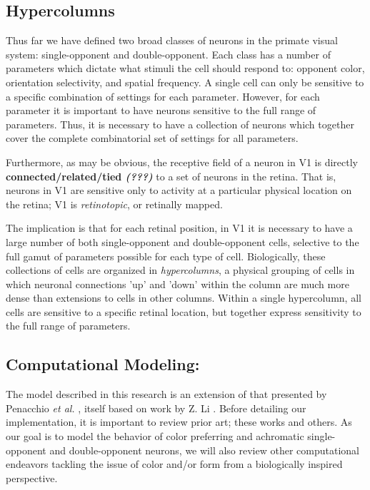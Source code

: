 \documentclass[journal,onecolumn]{IEEEtran}
\begin{document}
\subsection*{Hypercolumns}

Thus far we have defined two broad classes of neurons in the primate visual system: single-opponent and double-opponent. Each class has a number of parameters which dictate what stimuli the cell should respond to: opponent color, orientation selectivity, and spatial frequency. A single cell can only be sensitive to a specific combination of settings for each parameter. However, for each parameter it is important to have neurons sensitive to the full range of parameters. Thus, it is necessary to have a collection of neurons which together cover the complete combinatorial set of settings for all parameters.

Furthermore, as may be obvious, the receptive field of a neuron in V1 is directly \textbf{connected/related/tied \textit{(???)}} to a set of neurons in the retina. That is, neurons in V1 are sensitive only to activity at a particular physical location on the retina; V1 is \textit{retinotopic}, or retinally mapped.

The implication is that for each retinal position, in V1 it is necessary to have a large number of both single-opponent and double-opponent cells, selective to the full gamut of parameters possible for each type of cell. Biologically, these collections of cells are organized in \textit{hypercolumns}, a physical grouping of cells in which neuronal connections 'up' and 'down' within the column are much more dense than extensions to cells in other columns. Within a single hypercolumn, all cells are sensitive to a specific retinal location, but together express sensitivity to the full range of parameters.


\subsection{Computational Modeling:}

The model described in this research is an extension of that presented by Penacchio \textit{et al.} \cite{penacchio:2013}, itself based on work by Z. Li \cite{li:1998, li:1999}. Before detailing our implementation, it is important to review prior art; these works and others. As our goal is to model the behavior of color preferring and achromatic single-opponent and double-opponent neurons, we will also review other computational endeavors tackling the issue of color and/or form from a biologically inspired perspective.
\end{document}
